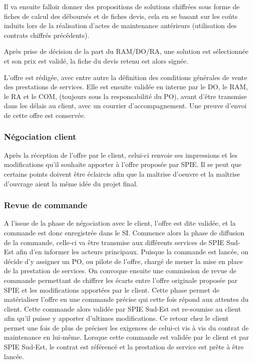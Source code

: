 Il va ensuite falloir donner des propositions de solutions chiffrées sous forme de fiches de calcul des déboursés et de fiches devis, cela en se basant sur les coûts induits lors de la réalisation d'actes de maintenance antérieurs (utilisation des contrats chiffrés précédents).

Après prise de décision de la part du RAM/DO/RA, une solution est sélectionnée et son prix est validé, la fiche du devis retenu est alors signée.

L'offre est rédigée, avec entre autre la définition des conditions générales de vente des prestations de services. Elle est ensuite validée en interne par le DO, le RAM, le RA et le COM, (toujours sous la responsabilité du PO), avant d’être transmise dans les délais au client, avec un courrier d'accompagnement. Une preuve d'envoi de cette offre est conservée.

\subsubsection{Négociation client}

Après la réception de l’offre par le client, celui-ci renvoie ses impressions et les modifications qu'il souhaite apporter à l'offre proposée par SPIE. Il se peut que certains points doivent être éclaircis afin que la maîtrise d'oeuvre et la maîtrise d'ouvrage aient la même idée du projet final.

\subsubsection{Revue de commande}

A l'issue de la phase de négociation avec le client, l'offre est dite validée, et la commande est donc enregistrée dans le SI. Commence alors la phase de diffusion de la commande, celle-ci va être transmise aux différents services de SPIE Sud-Est afin d’en informer les acteurs principaux. Puisque la commande est lancée, on décide d'y assigner un PO, ou pilote de l’offre, chargé de mener la mise en place de la prestation de services. On convoque ensuite une commission de revue de commande permettant de chiffrer les écarts entre l'offre originale proposée par SPIE et les modifications apportées par le client. Cette phase permet de matérialiser l'offre en une commande précise qui cette fois répond aux attentes du client. Cette commande alors validée par SPIE Sud-Est est re-soumise au client afin qu'il puisse y apporter d'ultimes modifications. Ce retour chez le client permet une fois de plus de préciser les exigences de celui-ci vis à vis du contrat de maintenance en lui-même. Lorsque cette commande est validée par le client et par SPIE Sud-Est, le contrat est référencé et la prestation de service est prête à être lancée.

